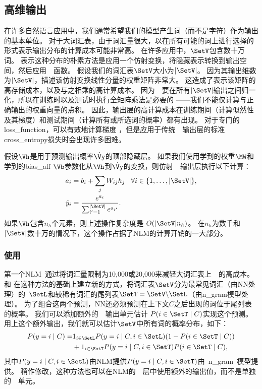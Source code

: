 \subsection{高维输出}
\label{sec:high_dimensional_outputs}

在许多自然语言应用中，我们通常希望我们的模型产生词（而不是字符）作为输出的基本单位。
对于大词汇表，由于词汇量很大，以在所有可能的词上进行选择的形式表示输出分布的计算成本可能非常高。
在许多应用中，$\SetV$包含数十万词。
表示这种分布的朴素方法是应用一个仿射变换，将隐藏表示转换到输出空间，然后应用~~函数。
假设我们的词汇表$\SetV$大小为$| \SetV |$。
因为其输出维数为$| \SetV |$，描述该仿射变换线性分量的权重矩阵非常大。
这造成了表示该矩阵的高存储成本，以及与之相乘的高计算成本。
因为~~要在所有$| \SetV |$输出之间归一化，所以在训练时以及测试时执行全矩阵乘法是必要的 ——我们不能仅计算与正确输出的权重向量的点积。
因此，输出层的高计算成本在训练期间（计算似然性及其梯度）和测试期间（计算所有或所选词的概率）都有出现。
对于专门的\gls{loss_function}，可以有效地计算梯度 \citep{Vincent2015}，但是应用于传统~~输出层的标准\gls{cross_entropy}损失时会出现许多困难。

假设$\Vh$是用于预测输出概率$\hat \Vy$的顶部隐藏层。
如果我们使用学到的权重$\MW$和学到的\gls{bias_aff} $\Vb$参数化从$\Vh$到$\hat \Vy$的变换，则仿射~~输出层执行以下计算：
\begin{align}
\label{eq:softmax-over-words}
  a_i &= b_i + \sum_j  W_{ij} h_j \;\;\; \forall i \in \{1,\ldots,|\SetV|\}, \\
  \hat{y}_i &= \frac{e^{a_i}}{\sum_{i'=1}^{|\SetV|} e^{a_{i'}}}.
\end{align}
如果$\Vh$包含$n_h$个元素，则上述操作复杂度是 $O(|\SetV| n_h)$。
在$n_h$为数千和$| \SetV |$数十万的情况下，这个操作占据了\gls{NLM}的计算开销的一大部分。


\subsubsection{使用}
第一个\gls{NLM}~\citep{BenDucVin01-small,Bengio-nnlm2003-small}通过将词汇量限制为10,000或20,000来减轻大词汇表上~~的高成本。
\citet{Schwenk+Gauvain2002}和 \citet{Schwenk-2007}在这种方法的基础上建立新的方式，将词汇表$\SetV$分为最常见词汇（由\gls{NN}处理）的~$\SetL$和较稀有词汇的尾列表$\SetT = \SetV \backslash \SetL$（由\gls{n_gram}模型处理）。
为了组合这两个预测，\gls{NN}还必须预测在上下文$C$之后出现的词位于尾列表的概率。
我们可以添加额外的~~输出单元估计 $P(i \in \SetT \mid C)$实现这个预测。
用上这个额外输出，我们就可以估计$\SetV$中所有词的概率分布，如下：
\begin{align}
 P(y=i\mid C)  =& 1_{i \in \SetL} P(y=i\mid C, i \in \SetL) (1 - P(i \in \SetT\mid C)) \nonumber \\
     & + 1_{i \in \SetT} P(y=i\mid C, i \in \SetT) P(i \in \SetT\mid C),
\end{align}
其中$P(y=i\mid C, i \in \SetL)$由\gls{NLM}提供$P(y=i\mid C, i \in \SetT)$由~\gls{n_gram}~模型提供。
稍作修改，这种方法也可以在\gls{NLM}的~~层中使用额外的输出值，而不是单独的~~单元。


